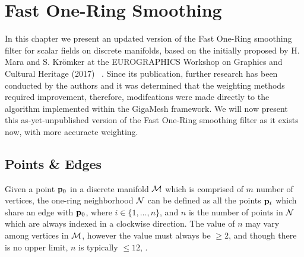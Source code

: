 \chapter{Fast One-Ring Smoothing}
In this chapter we present an updated version of the Fast One-Ring smoothing filter for scalar fields on discrete manifolds, based on the initially proposed by H. Mara and S. Krömker at the EUROGRAPHICS Workshop on Graphics and Cultural Heritage (2017) ~\cite[s.~3.2]{Mara17}. Since its publication, further research has been conducted by the authors and it was determined that the weighting methods required improvement, therefore, modifcations were made directly to the algorithm implemented within the GigaMesh \todoCitation framework. We will now present this as-yet-unpublished version of the Fast One-Ring smoothing filter as it exists now, with more accuracte weighting.
%
\section{Points \& Edges}
Given a point $\mathbf{p}_0$ in a discrete manifold $\mathcal{M}$ which is comprised of $m$ number of vertices, the one-ring neighborhood $\mathcal{N}$ can be defined as all the points $\mathbf{p}_i$ which share an edge with $\mathbf{p}_0$, where $i \in \{1, \ldots, n\}$, and $n$ is the number of points in $\mathcal{N}$ which are always indexed in a clockwise direction. The value of $n$ may vary among vertices in $\mathcal{M}$, however the value must always be $\geq 2$, and though there is no upper limit, $n$ is typically $\leq 12$, .%
%
%
%
%
%
%
%

